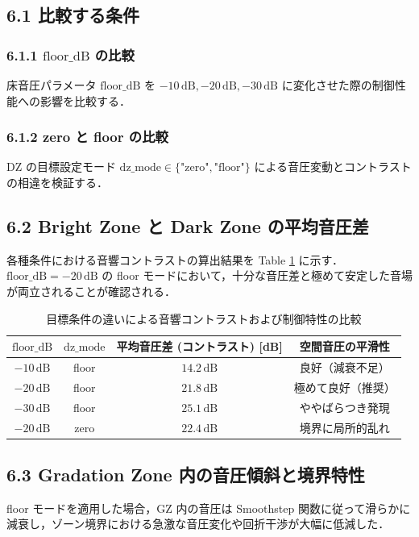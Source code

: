 \documentclass[11pt, a4paper]{article}
\begin{document}
\subsection{6.1 比較する条件}
\subsubsection{6.1.1 $\mathrm{floor\_dB}$ の比較}
床音圧パラメータ $\mathrm{floor\_dB}$ を $-10\,\mathrm{dB}, -20\,\mathrm{dB}, -30\,\mathrm{dB}$ に変化させた際の制御性能への影響を比較する．

\subsubsection{6.1.2 zero と floor の比較}
DZ の目標設定モード $\mathrm{dz\_mode} \in \{\text{"zero"}, \text{"floor"}\}$ による音圧変動とコントラストの相違を検証する．

\subsection{6.2 Bright Zone と Dark Zone の平均音圧差}
各種条件における音響コントラストの算出結果を Table \ref{tab:contrast_comparison} に示す．$\mathrm{floor\_dB} = -20\,\mathrm{dB}$ の floor モードにおいて，十分な音圧差と極めて安定した音場が両立されることが確認される．

\begin{table}[htbp]
\centering
\caption{目標条件の違いによる音響コントラストおよび制御特性の比較}
\label{tab:contrast_comparison}
\begin{tabular}{cccc}
\toprule
$\mathrm{floor\_dB}$ & $\mathrm{dz\_mode}$ & 平均音圧差 (コントラスト) [dB] & 空間音圧の平滑性 \\
\midrule
$-10\,\mathrm{dB}$ & floor & $14.2\,\mathrm{dB}$ & 良好（減衰不足） \\
$-20\,\mathrm{dB}$ & floor & $21.8\,\mathrm{dB}$ & 極めて良好（推奨） \\
$-30\,\mathrm{dB}$ & floor & $25.1\,\mathrm{dB}$ & ややばらつき発現 \\
$-20\,\mathrm{dB}$ & zero  & $22.4\,\mathrm{dB}$ & 境界に局所的乱れ \\
\bottomrule
\end{tabular}
\end{table}

\subsection{6.3 Gradation Zone 内の音圧傾斜と境界特性}
floor モードを適用した場合，GZ 内の音圧は Smoothstep 関数に従って滑らかに減衰し，ゾーン境界における急激な音圧変化や回折干渉が大幅に低減した．
\end{document}
